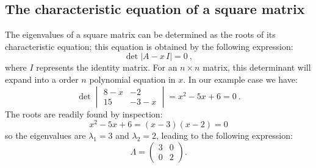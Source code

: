 \subsection{The characteristic equation of a square matrix}
The eigenvalues of a square matrix can be determined as the roots of its characteristic equation; this equation is obtained by the following expression:
\begin{equation}
	\det\left\vert A - x\,I\right\vert = 0\ ,\label{\chabbr:eq:characteristic}
\end{equation}
where $I$ represents the identity matrix.  For an $n\times n$ matrix, this determinant will expand into a order $n$ polynomial equation in $x$. In our example case we have:
\[
	\det \begin{vmatrix}8-x&-2\\ 15&-3-x\end{vmatrix} = x^2-5x+6 = 0\ .
\]
The roots are readily found by inspection:
\[
	x^2-5x+6 = (x-3)(x-2) = 0
\]
so the eigenvalues are $\lambda_1=3$ and $\lambda_2=2$, leading to the following expression:
\[
	\Lambda = \begin{pmatrix}3&0\\ 0&2\end{pmatrix}.
\]

